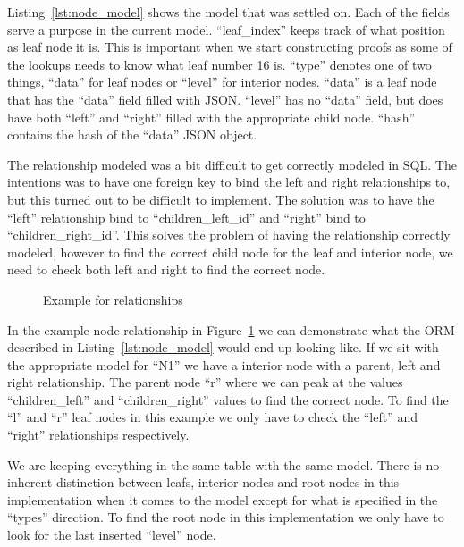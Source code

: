 \documentclass[../Main/thesis.tex]{subfiles}
\begin{document}
Listing~\ref{lst:node_model} shows the model that was settled on. Each of the
fields serve a purpose in the current model. ``leaf\_index'' keeps track of what
position as leaf node it is. This is important when we start constructing proofs
as some of the lookups needs to know what leaf number 16 is. ``type'' denotes
one of two things, ``data'' for leaf nodes or ``level'' for interior nodes.
``data'' is a leaf node that has the ``data'' field filled with JSON. ``level''
has no ``data'' field, but does have both ``left'' and ``right'' filled with the
appropriate child node. ``hash'' contains the hash of the ``data'' JSON object.

The relationship modeled was a bit difficult to get correctly modeled in SQL.
The intentions was to have one foreign key to bind the left and right
relationships to, but this turned out to be difficult to implement. The solution
was to have the ``left'' relationship bind to ``children\_left\_id'' and
``right'' bind to ``children\_right\_id''. This solves the problem of having the
relationship correctly modeled, however to find the correct child node for the
leaf and interior node, we need to check both left and right to find the correct
node.

\begin{figure}[hbst]
\centering
{}
\caption{Example for relationships}
\label{fig:relationship_example}
\end{figure}

In the example node relationship in Figure~\ref{fig:relationship_example} we can
demonstrate what the ORM described in Listing~\ref{lst:node_model} would end up
looking like. If we sit with the appropriate model for ``N1'' we have a interior
node with a parent, left and right relationship. The parent node ``r'' where
we can peak at the values ``children\_left'' and ``children\_right'' values to
find the correct node. To find the ``l'' and ``r'' leaf nodes in this example we
only have to check the ``left'' and ``right'' relationships respectively.

We are keeping everything in the same table with the same model. There is no
inherent distinction between leafs, interior nodes and root nodes in this
implementation when it comes to the model except for what is specified in the
``types'' direction. To find the root node in this implementation we only have
to look for the last inserted ``level'' node.
\end{document}
